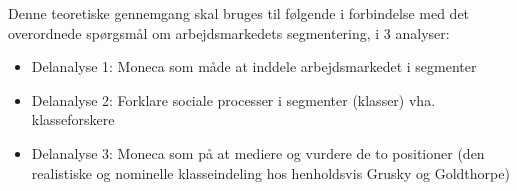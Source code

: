 



Denne teoretiske gennemgang skal bruges til følgende i forbindelse med det overordnede spørgsmål om arbejdsmarkedets segmentering, i 3 analyser:

\begin{itemize}
  \item Delanalyse 1: Moneca som måde at inddele arbejdsmarkedet i segmenter
  \item Delanalyse 2: Forklare sociale processer i segmenter (klasser) vha. klasseforskere
  \item Delanalyse 3: Moneca som på at mediere og vurdere de to positioner (den realistiske og nominelle klasseindeling hos henholdsvis Grusky og Goldthorpe)
\end{itemize}




